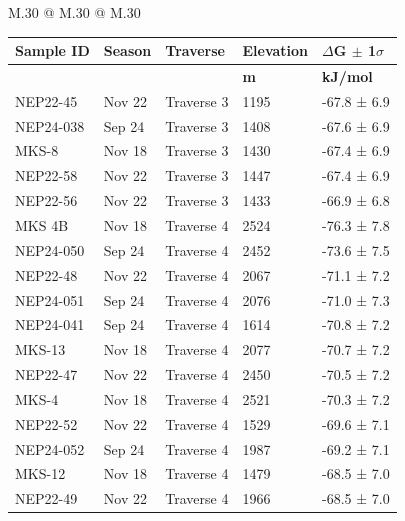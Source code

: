    \begin{landscape}
    
    \begin{table}
        \scriptsize  %
        \setlength\tabcolsep{2mm}
        \begin{tabular}{M{.30\textwidth} @{\hspace{4cm}} M{.30\textwidth} @{\hspace{4cm}} M{.30\textwidth}}
            \begin{tabular}{l l l l l}
            \textbf{Sample ID}  &  \textbf{Season}  &  \textbf{Traverse}  &  \textbf{Elevation}  &  \textbf{$\Delta$G $\pm$ 1$\sigma$} \\
            \hline
            &   &   &  \textbf{m}  &  \textbf{kJ/mol} \\
            \hline
    NEP22-45 & Nov 22 & Traverse 3 & 1195 & -67.8 ±  6.9 \\
    NEP24-038 & Sep 24 & Traverse 3 & 1408 & -67.6 ±  6.9 \\
    MKS-8 & Nov 18 & Traverse 3 & 1430 & -67.4 ±  6.9 \\
    NEP22-58 & Nov 22 & Traverse 3 & 1447 & -67.4 ±  6.9 \\
    NEP22-56 & Nov 22 & Traverse 3 & 1433 & -66.9 ±  6.8 \\
    \specialrule{0.2pt}{1pt}{1pt}
    MKS 4B & Nov 18 & Traverse 4 & 2524 & -76.3 ±  7.8 \\
    NEP24-050 & Sep 24 & Traverse 4 & 2452 & -73.6 ±  7.5 \\
    NEP22-48 & Nov 22 & Traverse 4 & 2067 & -71.1 ±  7.2 \\
    NEP24-051 & Sep 24 & Traverse 4 & 2076 & -71.0 ±  7.3 \\
    NEP24-041 & Sep 24 & Traverse 4 & 1614 & -70.8 ±  7.2 \\
    MKS-13 & Nov 18 & Traverse 4 & 2077 & -70.7 ±  7.2 \\
    NEP22-47 & Nov 22 & Traverse 4 & 2450 & -70.5 ±  7.2 \\
    MKS-4 & Nov 18 & Traverse 4 & 2521 & -70.3 ±  7.2 \\
    NEP22-52 & Nov 22 & Traverse 4 & 1529 & -69.6 ±  7.1 \\
    NEP24-052 & Sep 24 & Traverse 4 & 1987 & -69.2 ±  7.1 \\
    MKS-12 & Nov 18 & Traverse 4 & 1479 & -68.5 ±  7.0 \\
    NEP22-49 & Nov 22 & Traverse 4 & 1966 & -68.5 ±  7.0 \\

\end{tabular}
\end{tabular}
\end{table}
\end{landscape}
